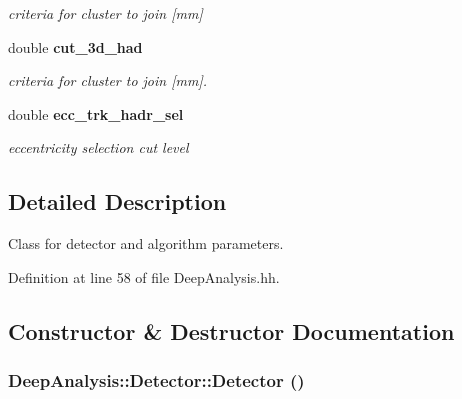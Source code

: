 \begin{DoxyCompactItemize}
\begin{DoxyCompactList}\small\item\em criteria for cluster to join [mm] \item\end{DoxyCompactList}\item 
double {\bf cut\_\-3d\_\-had}
\begin{DoxyCompactList}\small\item\em criteria for cluster to join [mm]. \item\end{DoxyCompactList}\item 
double {\bf ecc\_\-trk\_\-hadr\_\-sel}\label{classDeepAnalysis_1_1Detector_a165ef75ffb1ffba3a833c00d346a9728}

\begin{DoxyCompactList}\small\item\em eccentricity selection cut level \item\end{DoxyCompactList}\end{DoxyCompactItemize}


\subsection{Detailed Description}
Class for detector and algorithm parameters. 

Definition at line 58 of file DeepAnalysis.hh.

\subsection{Constructor \& Destructor Documentation}
\subsubsection[{Detector}]{\setlength{\rightskip}{0pt plus 5cm}DeepAnalysis::Detector::Detector ()\hspace{0.3cm}{\ttfamily  [inline]}}\label{classDeepAnalysis_1_1Detector_a509e9cb64988132ac7862c61704231be}


